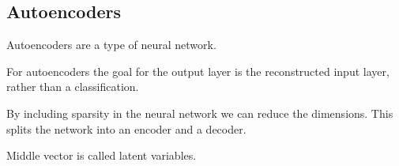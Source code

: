 
\subsection{Autoencoders}

Autoencoders are a type of neural network.

For autoencoders the goal for the output layer is the reconstructed input layer, rather than a classification.

By including sparsity in the neural network we can reduce the dimensions. This splits the network into an encoder and a decoder.

Middle vector is called latent variables.

